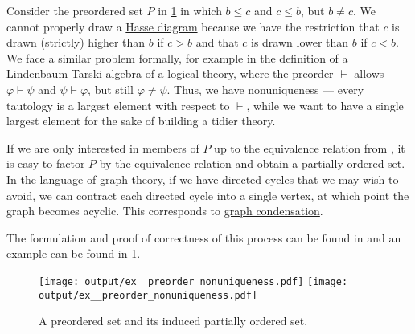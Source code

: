 \begin{example}\label{ex:preorder_nonuniqueness}
  Consider the preordered set \( P \) in \cref{fig:ex:preorder_nonuniqueness} in which \( b \leq c \) and \( c \leq b \), but \( b \neq c \). We cannot properly draw a \hyperref[def:hasse_diagram]{Hasse diagram} because we have the restriction that \( c \) is drawn (strictly) higher than \( b \) if \( c > b \) and that \( c \) is drawn lower than \( b \) if \( c < b \). We face a similar problem formally, for example in the definition of a \hyperref[def:lindenbaum_tarski_algebra]{Lindenbaum-Tarski algebra} of a \hyperref[def:first_order_theory]{logical theory}, where the preorder \( \vdash \) allows \( \varphi \vdash \psi \) and \( \psi \vdash \varphi \), but still \( \varphi \neq \psi \). Thus, we have nonuniqueness --- every tautology is a largest element with respect to \( \vdash \), while we want to have a single largest element for the sake of building a tidier theory.

  If we are only interested in members of \( P \) up to the equivalence relation from , it is easy to factor \( P \) by the equivalence relation and obtain a partially ordered set. In the language of graph theory, if we have \hyperref[def:quiver_path/cycle]{directed cycles} that we may wish to avoid, we can contract each directed cycle into a single vertex, at which point the graph becomes acyclic. This corresponds to \hyperref[def:quiver_condensation]{graph condensation}.

  The formulation and proof of correctness of this process can be found in  and an example can be found in \cref{fig:ex:preorder_nonuniqueness}.

  \begin{figure}[!ht]
    \hfill
    \texttt{[image: output/ex\_\_preorder\_nonuniqueness.pdf]}
    \hfill
    \texttt{[image: output/ex\_\_preorder\_nonuniqueness.pdf]}
    \hfill\hfill
    \caption{A preordered set and its induced partially ordered set.}
    \label{fig:ex:preorder_nonuniqueness}
  \end{figure}
\end{example}

